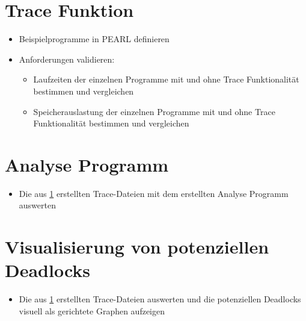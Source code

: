 \section{Trace Funktion}\label{Validierung:Trace Funktion}
\begin{itemize}
  \item Beispielprogramme in PEARL definieren
  \item Anforderungen validieren:
  \begin{itemize}
    \item Laufzeiten der einzelnen Programme mit und ohne Trace Funktionalität
    bestimmen und vergleichen
    \item Speicherauslastung der einzelnen Programme mit und ohne Trace
    Funktionalität bestimmen und vergleichen
  \end{itemize}
\end{itemize}

\section{Analyse Programm}
\begin{itemize}
  \item Die aus \cref{Validierung:Trace Funktion} erstellten Trace-Dateien mit
  dem erstellten Analyse Programm auswerten
\end{itemize}

\section{Visualisierung von potenziellen Deadlocks}
\begin{itemize}
  \item Die aus \cref{Validierung:Trace Funktion} erstellten Trace-Dateien
  auswerten und die potenziellen Deadlocks visuell als gerichtete
  Graphen aufzeigen
\end{itemize}
